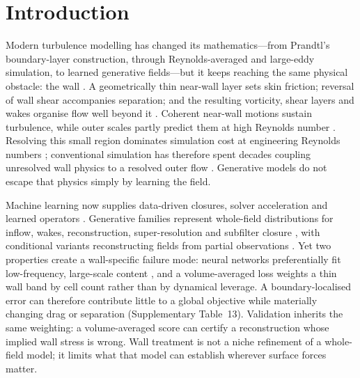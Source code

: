\section{Introduction}\label{sec:intro}

Modern turbulence modelling has changed its mathematics---from Prandtl's boundary-layer
construction, through Reynolds-averaged and large-eddy simulation, to learned generative
fields---but it keeps reaching the same physical obstacle: the wall
\cite{prandtl1904,pope2000,piomelli2002wall,bose2018wmles}. A geometrically thin near-wall layer
sets skin friction; reversal of wall shear
accompanies separation; and the resulting vorticity, shear layers and wakes organise flow well
beyond it \cite{schlichting2017boundary,pope2000}. Coherent near-wall motions sustain turbulence,
while outer scales partly predict them at high Reynolds number
\cite{robinson1991coherent,jimenez1999autonomous,mathis2009amplitude,marusic2010predictive,smits2011highre,lee2015direct}. Resolving this
small region dominates simulation cost at engineering Reynolds numbers
\cite{chapman1979computational,choi2012grid}; conventional simulation has therefore spent
decades coupling unresolved wall physics to a resolved outer flow
\cite{schumann1975subgrid,cabot2000approximate,larsson2016wmles}. Generative models do not escape
that physics simply by learning the field.

Machine learning now supplies data-driven closures, solver acceleration and learned operators
\cite{ling2016reynolds,duraisamy2019turbulence,kochkov2021machine,brunton2020machine,vinuesa2022enhancing,li2021fno,lu2021deeponet}.
Generative families represent whole-field distributions for inflow, wakes, reconstruction,
super-resolution and subfilter closure
\cite{goodfellow2014gan,ho2020ddpm,song2021sde,karras2022edm,lipman2023flow,
kim2020deep,drygala2022generative,lienen2024zero,buzzicotti2021reconstruction,stengel2020adversarial,bode2021piesrgan,kohl2024benchmarking,dong2025stochclosure},
with conditional variants reconstructing fields from partial observations
\cite{chung2023dps,song2023pigdm,wang2023ddnm,shu2023pidiffusion,rybchuk2023}. Yet two properties
create a wall-specific failure mode: neural networks preferentially fit low-frequency,
large-scale content \cite{rahaman2019spectral,oommen2026learning}, and a volume-averaged loss
weights a thin wall band by cell count rather than by dynamical leverage. A boundary-localised
error can therefore contribute little to a global objective while materially changing drag or
separation (Supplementary Table~13). Validation inherits the same weighting: a volume-averaged
score can certify a reconstruction whose implied wall stress is wrong. Wall treatment is not a
niche refinement of a whole-field
model; it limits what that model can establish wherever surface forces matter.

